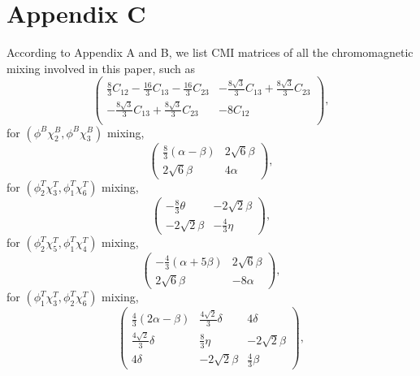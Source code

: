 \documentclass[prt,twocolumn,floatfix,nofootinbib]{revtex4}
\begin{document}
\section*{Appendix C}\label{AppendixC}
\setcounter{equation}{0}
\renewcommand{\theequation}{C\arabic{equation}}
According to Appendix A and B, we list CMI matrices of all the chromomagnetic mixing involved in this paper, such as
\begin{equation}\label{mixing23}
    \begin{pmatrix}
        \frac{8}{3}C_{12}-\frac{16}{3}C_{13}-\frac{16}{3}C_{23} & -\frac{8\sqrt{3}}{3}C_{13}+\frac{8\sqrt{3}}{3}C_{23} \\
        -\frac{8\sqrt{3}}{3}C_{13}+\frac{8\sqrt{3}}{3}C_{23} & -8C_{12} \\
    \end{pmatrix},
\end{equation}
for $(\phi^{B}\chi_{2}^{B},\phi^{B}\chi_{3}^{B})$ mixing,
\begin{equation}\label{21mixing36}
    \begin{pmatrix}
        \frac{8}{3}(\alpha-\beta)   & 2\sqrt{6}\beta \\
        2\sqrt{6}\beta              & 4\alpha
    \end{pmatrix},
\end{equation}
for $(\phi_{2}^{T}\chi_{3}^{T},\phi_{1}^{T}\chi_{6}^{T})$ mixing,
\begin{equation}\label{21mixing54}
    \begin{pmatrix}
        -\frac{8}{3}\theta  & -2\sqrt{2}\beta \\
        -2\sqrt{2}\beta     & -\frac{4}{3}\eta
    \end{pmatrix},
\end{equation}
for $(\phi_{2}^{T}\chi_{5}^{T},\phi_{1}^{T}\chi_{4}^{T})$ mixing,
\begin{equation}\label{12mixing36}
    \begin{pmatrix}
        -\frac{4}{3}(\alpha+5\beta) & 2\sqrt{6}\beta \\
        2\sqrt{6}\beta              & -8\alpha
    \end{pmatrix},
\end{equation}
for $(\phi_{1}^{T}\chi_{3}^{T},\phi_{2}^{T}\chi_{6}^{T})$ mixing,
\begin{equation}\label{221mixing245}
    \begin{pmatrix}
        \frac{4}{3}(2\alpha-\beta)  & \frac{4\sqrt{2}}{3}\delta & 4\delta \\
        \frac{4\sqrt{2}}{3}\delta   & \frac{8}{3}\eta           & -2\sqrt{2}\beta \\
        4\delta                     & -2\sqrt{2}\beta           & \frac{4}{3}\beta
    \end{pmatrix},
\end{equation}
\end{document}
